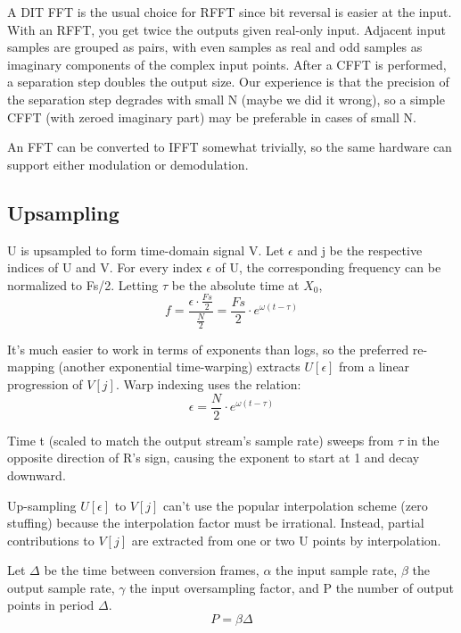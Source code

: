 A DIT FFT is the usual choice for RFFT since bit reversal is easier at the input.
With an RFFT, you get twice the outputs given real-only input.
Adjacent input samples are grouped as pairs, with even samples as real and odd
samples as imaginary components of the complex input points.
After a CFFT is performed, a separation step doubles the output size.
Our experience is that the precision of the separation step degrades with small N
(maybe we did it wrong), so a simple CFFT (with zeroed imaginary part)
may be preferable in cases of small N.

An FFT can be converted to IFFT somewhat trivially, so the same hardware can
support either modulation or demodulation.

\subsection{Upsampling}

U is upsampled to form time-domain signal V.
Let $\epsilon$ and j be the respective indices of U and V.
For every index $\epsilon$ of U, the corresponding frequency can be normalized
to Fs/2.
Letting $\tau$ be the absolute time at $X_0$,
\begin{equation}
f = \frac{\epsilon\cdot\frac{Fs}{2}}{\frac{N}{2}}
= \frac{Fs}{2}\cdot e^{\omega(t - \tau)}
\end{equation}

It's much easier to work in terms of exponents than logs,
so the preferred re-mapping (another exponential time-warping) extracts
$U[\epsilon]$ from a linear progression of $V[j]$.
Warp indexing uses the relation:
\begin{equation}
\epsilon = \frac{N}{2}\cdot e^{\omega(t - \tau)}
\end{equation}

Time t (scaled to match the output stream's sample rate) sweeps from $\tau$
in the opposite direction of R's sign,
causing the exponent to start at 1 and decay downward.

Up-sampling $U[\epsilon]$ to $V[j]$ can't use the popular interpolation scheme
(zero stuffing) because the interpolation factor must be irrational. Instead,
partial contributions to $V[j]$ are extracted from one or two U points by
interpolation.

Let $\Delta$ be the time between conversion frames,
$\alpha$ the input sample rate,
$\beta$ the output sample rate,
$\gamma$ the input oversampling factor,
and P the number of output points in period $\Delta$.
\begin{equation}
P = \beta\Delta
\end{equation}

